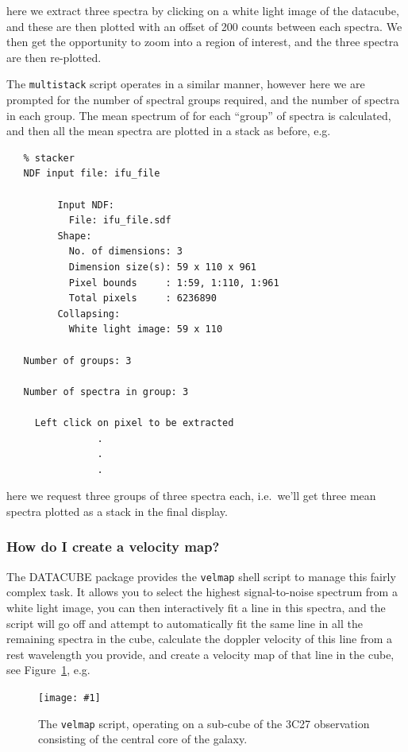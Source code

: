 \documentclass[twoside,11pt]{article}
\newcommand{\htmladdimg}[1]{}
\newcommand{\xref}[3]{#1}
\newcommand{\xlabel}[1]{}
\newcommand{\myfig} [5] {
  \begin{figure}
    \centering\texttt{[image: \#1]}
    \typeout{#1 inserted on page \arabic{page}}
    \caption{\label{#4}#5}
  \end{figure}
  }
\newcommand{\myfig}[5]{
    \label{#4} \htmladdimg{#3}\\
    Figure: #5\\
    }
\begin{document}
here we extract three spectra by clicking on a white light image of the datacube, and these are then plotted with an offset of 200 counts between each spectra. We then get the opportunity to zoom into a region of interest, and the three spectra are then re-plotted.

The {\tt multistack} script operates in a similar manner, however here we are prompted for the number of spectral groups required, and the number of spectra in each group. The mean spectrum of for each ``group'' of spectra is calculated, and then all the mean spectra are plotted in a stack as before, e.g.\ 

\small\begin{verbatim}
   % stacker
   NDF input file: ifu_file
 
         Input NDF:
           File: ifu_file.sdf
         Shape:
           No. of dimensions: 3
           Dimension size(s): 59 x 110 x 961
           Pixel bounds     : 1:59, 1:110, 1:961
           Total pixels     : 6236890
         Collapsing:
           White light image: 59 x 110
  
   Number of groups: 3
 
   Number of spectra in group: 3
  
     Left click on pixel to be extracted
                .
                .
                .	     
\end{verbatim}\normalsize

here we request three groups of three spectra each, i.e.\ we'll get three mean spectra plotted as a stack in the final display.

\subsubsection{\label{sc16_velmap}How do I create a velocity map?\xlabel{sc16_velmap}}

The DATACUBE package provides the \xref{{\tt velmap}}{sun237}{velmap} shell script to manage this fairly complex task. It allows you to select the highest signal-to-noise spectrum from a white light image, you can then interactively fit a line in this spectra, and the script will go off and attempt to automatically fit the same line in all the remaining spectra in the cube, calculate the doppler velocity of this line from a rest wavelength you provide, and create a velocity map of that line in the cube, see Figure~\ref{sc16_velmap_fig}, e.g.\

\myfig{sc16_velmap.eps}{height=0.4\textheight}{sc16_velmap_anim.gif}{sc16_velmap_fig}{The {\tt velmap} script, operating on a sub-cube of the 3C27 observation consisting of the central core of the galaxy.}
\end{document}
